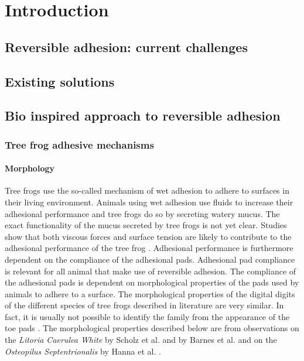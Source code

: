 \chapter{Introduction}\label{ch:introduction}
\section{Reversible adhesion: current challenges}\label{sec:current_challenges}
\section{Existing solutions}\label{sec:existing solutions}
\section{Bio inspired approach to reversible adhesion}\label{sec:bio_inspired_approach}
\subsection{Tree frog adhesive mechanisms}\label{sec:tree_frog_adhesion}
\subsubsection{Morphology}
\qquad Tree frogs use the so-called mechanism of wet adhesion to adhere to surfaces in their living environment. Animals using wet adhesion use fluids to increase their adhesional performance and tree frogs do so by secreting watery mucus. The exact functionality of the mucus secreted by tree frogs is not yet clear. Studies show that both viscous forces and surface tension are likely to contribute to the adhesional performance of the tree frog \cite{hanna1991adhesion}. Adhesional performance is furthermore dependent on the compliance of the adhesional pads. Adhesional pad compliance is relevant for all animal that make use of reversible adhesion. The compliance of the adhesional pads is dependent on morphological properties of the pads used by animals to adhere to a surface. The morphological properties of the digital digits of the different species of tree frogs described in literature are very similar. In fact, it is usually not possible to identify the family from the appearance of the toe pads \cite{barnes2011elastic}. The morphological properties described below are from observations on the \textit{Litoria Caerulea White} by Scholz et al. and by Barnes et al. \cite{scholz2009ultrastructure,barnes2011elastic} and on the \textit{Osteopilus Septentrionalis} by Hanna et al. \cite{hanna1991adhesion}.\\

